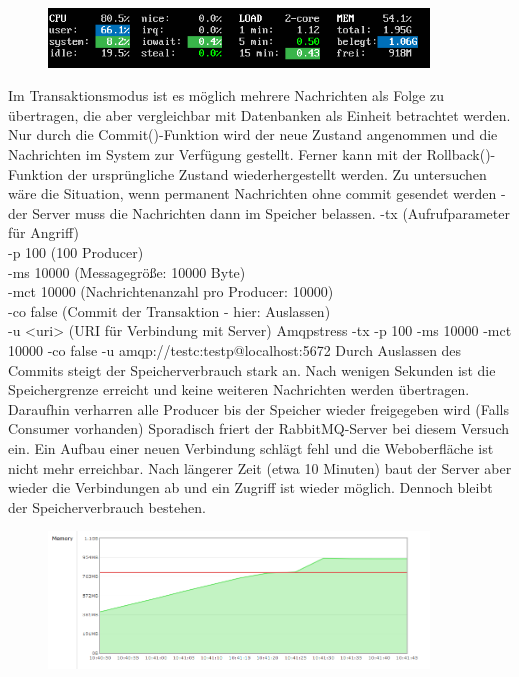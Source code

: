 \documentclass[	a4paper,
			11pt,
			titlepage,
			oneside,
			fleqn,
			listof=totoc,
			parskip,
			chapterprefix=false,
			numbers=noenddot]{scrreprt}
\begin{document}
\begin{figure}[H]
	\vspace{0.5cm}
	\centering
	\includegraphics[width=0.9\textwidth]{img/channel/100con100ms}
\end{figure}

\clearpage
		{Im Transaktionsmodus ist es möglich mehrere Nachrichten als Folge zu übertragen, die aber vergleichbar mit Datenbanken als Einheit betrachtet werden. Nur durch die Commit()-Funktion wird der neue Zustand angenommen und die Nachrichten im System zur Verfügung gestellt. Ferner kann mit der Rollback()-Funktion der ursprüngliche Zustand wiederhergestellt werden. Zu untersuchen wäre die Situation, wenn permanent Nachrichten ohne commit gesendet werden - der Server muss die Nachrichten dann im Speicher belassen. }%
		{%
		 -tx (Aufrufparameter für Angriff) \\
		 -p 100 (100 Producer) \\
		 -ms 10000 (Messagegröße: 10000 Byte) \\
		 -mct 10000 (Nachrichtenanzahl pro Producer: 10000) \\
		 -co false (Commit der Transaktion - hier: Auslassen) \\
		 -u <uri> (URI für Verbindung mit Server)
		}%
		{Amqpstress -tx -p 100 -ms 10000 -mct 10000 -co false -u amqp://testc:testp@localhost:5672}%
		{Durch Auslassen des Commits steigt der Speicherverbrauch stark an. Nach wenigen Sekunden ist die Speichergrenze erreicht und keine weiteren Nachrichten werden übertragen. Daraufhin verharren alle Producer bis der Speicher wieder freigegeben wird (Falls Consumer vorhanden) }
		{Sporadisch friert der RabbitMQ-Server bei diesem Versuch ein. Ein Aufbau einer neuen Verbindung schlägt fehl und die Weboberfläche ist nicht mehr erreichbar. Nach längerer Zeit (etwa 10 Minuten) baut der Server aber wieder die Verbindungen ab und ein Zugriff ist wieder möglich. Dennoch bleibt der Speicherverbrauch bestehen.}

\begin{figure}[H]
	\vspace{0.5cm}
	\centering
	\includegraphics[width=0.9\textwidth]{img/commit/noCommit100p}
\end{figure}
\end{document}
